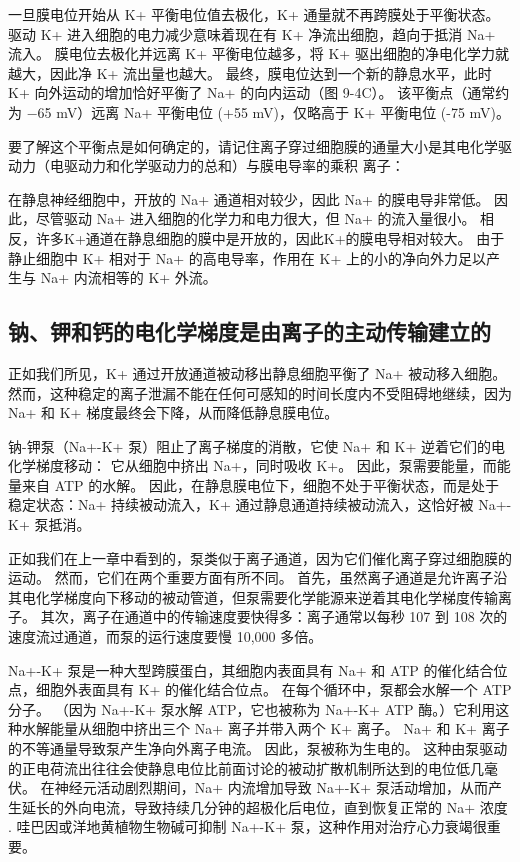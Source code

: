 一旦膜电位开始从 K+ 平衡电位值去极化，K+ 通量就不再跨膜处于平衡状态。 
驱动 K+ 进入细胞的电力减少意味着现在有 K+ 净流出细胞，趋向于抵消 Na+ 流入。 
膜电位去极化并远离 K+ 平衡电位越多，将 K+ 驱出细胞的净电化学力就越大，因此净 K+ 流出量也越大。 最终，膜电位达到一个新的静息水平，此时 K+ 向外运动的增加恰好平衡了 Na+ 的向内运动（图 9-4C）。 
该平衡点（通常约为 −65 mV）远离 Na+ 平衡电位 (+55 mV)，仅略高于 K+ 平衡电位 (-75 mV)。


要了解这个平衡点是如何确定的，请记住离子穿过细胞膜的通量大小是其电化学驱动力（电驱动力和化学驱动力的总和）与膜电导率的乘积 离子：


在静息神经细胞中，开放的 Na+ 通道相对较少，因此 Na+ 的膜电导非常低。 
因此，尽管驱动 Na+ 进入细胞的化学力和电力很大，但 Na+ 的流入量很小。 
相反，许多K+通道在静息细胞的膜中是开放的，因此K+的膜电导相对较大。 
由于静止细胞中 K+ 相对于 Na+ 的高电导率，作用在 K+ 上的小的净向外力足以产生与 Na+ 内流相等的 K+ 外流。



\subsection{钠、钾和钙的电化学梯度是由离子的主动传输建立的}
正如我们所见，K+ 通过开放通道被动移出静息细胞平衡了 Na+ 被动移入细胞。 
然而，这种稳定的离子泄漏不能在任何可感知的时间长度内不受阻碍地继续，因为 Na+ 和 K+ 梯度最终会下降，从而降低静息膜电位。


钠-钾泵（Na+-K+ 泵）阻止了离子梯度的消散，它使 Na+ 和 K+ 逆着它们的电化学梯度移动：
它从细胞中挤出 Na+，同时吸收 K+。 
因此，泵需要能量，而能量来自 ATP 的水解。 
因此，在静息膜电位下，细胞不处于平衡状态，而是处于稳定状态：Na+ 持续被动流入，K+ 通过静息通道持续被动流入，这恰好被 Na+-K+ 泵抵消。


正如我们在上一章中看到的，泵类似于离子通道，因为它们催化离子穿过细胞膜的运动。 
然而，它们在两个重要方面有所不同。 
首先，虽然离子通道是允许离子沿其电化学梯度向下移动的被动管道，但泵需要化学能源来逆着其电化学梯度传输离子。 
其次，离子在通道中的传输速度要快得多：离子通常以每秒 107 到 108 次的速度流过通道，而泵的运行速度要慢 10,000 多倍。


Na+-K+ 泵是一种大型跨膜蛋白，其细胞内表面具有 Na+ 和 ATP 的催化结合位点，细胞外表面具有 K+ 的催化结合位点。 
在每个循环中，泵都会水解一个 ATP 分子。 
（因为 Na+-K+ 泵水解 ATP，它也被称为 Na+-K+ ATP 酶。）它利用这种水解能量从细胞中挤出三个 Na+ 离子并带入两个 K+ 离子。 
Na+ 和 K+ 离子的不等通量导致泵产生净向外离子电流。 
因此，泵被称为生电的。 
这种由泵驱动的正电荷流出往往会使静息电位比前面讨论的被动扩散机制所达到的电位低几毫伏。 
在神经元活动剧烈期间，Na+ 内流增加导致 Na+-K+ 泵活动增加，从而产生延长的外向电流，导致持续几分钟的超极化后电位，直到恢复正常的 Na+ 浓度 . 哇巴因或洋地黄植物生物碱可抑制 Na+-K+ 泵，这种作用对治疗心力衰竭很重要。


